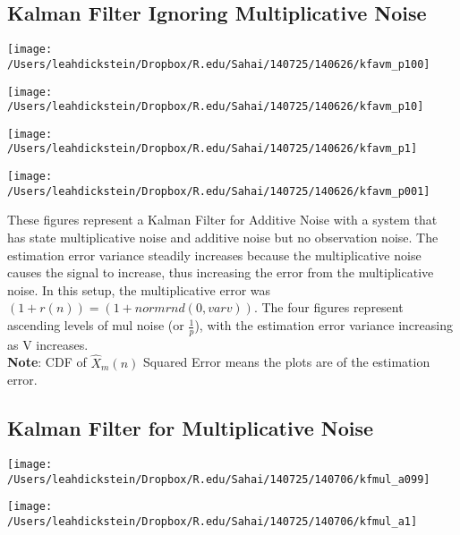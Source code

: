 \documentclass[leqno,twocolumn]{article}
\begin{document}
\subsection{Kalman Filter Ignoring Multiplicative Noise}
\begin{minipage}[c]{0.5\textwidth}
\texttt{[image: /Users/leahdickstein/Dropbox/R.edu/Sahai/140725/140626/kfavm\_p100]}
\end{minipage}
\begin{minipage}[c]{0.5\textwidth}
\texttt{[image: /Users/leahdickstein/Dropbox/R.edu/Sahai/140725/140626/kfavm\_p10]}
\end{minipage}

\begin{minipage}[c]{0.5\textwidth}
\texttt{[image: /Users/leahdickstein/Dropbox/R.edu/Sahai/140725/140626/kfavm\_p1]}
\end{minipage}
\begin{minipage}[c]{0.5\textwidth}
\texttt{[image: /Users/leahdickstein/Dropbox/R.edu/Sahai/140725/140626/kfavm\_p001]}
\end{minipage}

These figures represent a Kalman Filter for Additive Noise with a system that has state multiplicative noise and additive noise but no observation noise. The estimation error variance steadily increases because the multiplicative noise causes the signal to increase, thus increasing the error from the multiplicative noise. In this setup, the multiplicative error was $(1+r(n)) = (1+normrnd(0,varv))$. The four figures represent ascending levels of mul noise (or $\frac{1}{p}$), with the estimation error variance increasing as V increases.\\
\textbf{Note}: CDF of $\hat{X}_m(n)$ Squared Error means the plots are of the estimation error.

\subsection{Kalman Filter for Multiplicative Noise}
\begin{minipage}[c]{0.5\textwidth}
\texttt{[image: /Users/leahdickstein/Dropbox/R.edu/Sahai/140725/140706/kfmul\_a099]}
\end{minipage}
\begin{minipage}[c]{0.5\textwidth}
\texttt{[image: /Users/leahdickstein/Dropbox/R.edu/Sahai/140725/140706/kfmul\_a1]}
\end{minipage}
\end{document}
